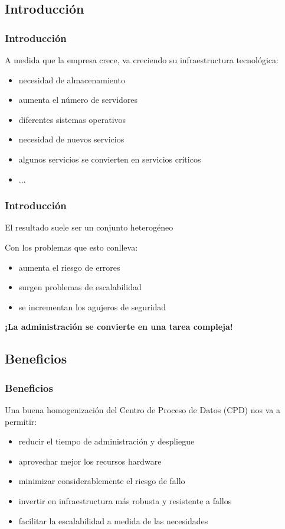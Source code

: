 \documentclass{beamer}
\begin{document}
\subsection{Introducción}
\begin{frame}
  \frametitle{Introducción}
  A medida que la empresa crece, va creciendo su infraestructura tecnológica:
  \begin{itemize}
    \item necesidad de almacenamiento
    \item aumenta el número de servidores
    \item diferentes sistemas operativos
    \item necesidad de nuevos servicios
    \item algunos servicios se convierten en servicios críticos
    \item ...
  \end{itemize}
\end{frame}

\begin{frame}
  \frametitle{Introducción}
  
  \begin{center}
    \alert{El resultado suele ser un conjunto heterogéneo}
  \end{center}
  \pause
  Con los problemas que esto conlleva:
  \begin{itemize}
    \item aumenta el riesgo de errores
    \item surgen problemas de escalabilidad
    \item se incrementan los agujeros de seguridad
  \end{itemize}
  \pause
  \begin{center}
    \textbf{¡La administración se convierte en una tarea compleja!}
  \end{center}
\end{frame}

\subsection{Beneficios}
\begin{frame}
  \frametitle{Beneficios}
  Una buena homogenización del Centro de Proceso de Datos (CPD) nos va a permitir:
  \begin{itemize}
    \item reducir el tiempo de administración y despliegue
    \item aprovechar mejor los recursos hardware
    \item minimizar considerablemente el riesgo de fallo
    \item invertir en infraestructura más robusta y resistente a fallos
    \item facilitar la escalabilidad a medida de las necesidades
  \end{itemize} 
\end{frame}
\end{document}
